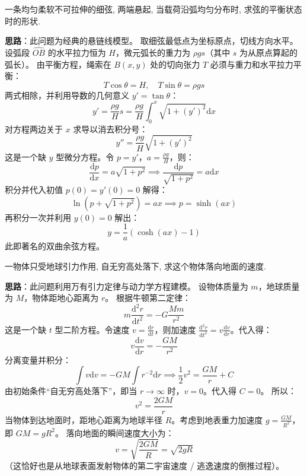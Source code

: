 \documentclass[lang=cn,11pt]{elegantbook}
\begin{document}
\begin{exercise}[物理建模与微分方程的推导]
一条均匀柔软不可拉伸的细弦, 两端悬起, 当载荷沿弧均匀分布时, 求弦的平衡状态时的形状.
\end{exercise}
\begin{solution}
\textbf{思路}：此问题为经典的悬链线模型。
取细弦最低点为坐标原点，切线方向水平。设弧段 $\widehat{OB}$ 的水平拉力恒为 $H$，微元弧长的重力为 $\rho g s$（其中 $s$ 为从原点算起的弧长）。
由平衡方程，绳索在 $B(x,y)$ 处的切向张力 $T$ 必须与重力和水平拉力平衡：
\[
T \cos\theta = H, \quad T \sin\theta = \rho g s
\]
两式相除，并利用导数的几何意义 $y' = \tan\theta$：
\[
y' = \frac{\rho g}{H} s = \frac{\rho g}{H} \int_0^x \sqrt{1+(y')^2}\mathrm{d}x
\]
对方程两边关于 $x$ 求导以消去积分号：
\[
y'' = \frac{\rho g}{H} \sqrt{1+(y')^2}
\]
这是一个缺 $y$ 型微分方程。令 $p=y'$，$a=\frac{\rho g}{H}$，则：
\[
\frac{\mathrm{d}p}{\mathrm{d}x} = a\sqrt{1+p^2} \implies \frac{\mathrm{d}p}{\sqrt{1+p^2}} = a\mathrm{d}x
\]
积分并代入初值 $p(0)=y'(0)=0$ 解得：
\[
\ln(p+\sqrt{1+p^2}) = ax \implies p = \sinh(ax)
\]
再积分一次并利用 $y(0)=0$ 解出：
\[
\boxed{y = \frac{1}{a}(\cosh(ax)-1)}
\]
此即著名的双曲余弦方程。
\end{solution}

\begin{exercise}[基于牛顿第二定律降阶求解]
一物体只受地球引力作用, 自无穷高处落下, 求这个物体落向地面的速度.
\end{exercise}
\begin{solution}
\textbf{思路}：此问题利用万有引力定律与动力学方程建模。
设物体质量为 $m$，地球质量为 $M$，物体距地心距离为 $r$。
根据牛顿第二定律：
\[
m\frac{\mathrm{d}^2r}{\mathrm{d}t^2} = -G\frac{Mm}{r^2}
\]
这是一个缺 $t$ 型二阶方程。令速度 $v = \frac{\mathrm{d}r}{\mathrm{d}t}$，则加速度 $\frac{\mathrm{d}^2r}{\mathrm{d}t^2} = v\frac{\mathrm{d}v}{\mathrm{d}r}$。代入得：
\[
v\frac{\mathrm{d}v}{\mathrm{d}r} = -\frac{GM}{r^2}
\]
分离变量并积分：
\[
\int v\mathrm{d}v = -GM \int r^{-2}\mathrm{d}r \implies \frac{1}{2}v^2 = \frac{GM}{r} + C
\]
由初始条件“自无穷高处落下”，即当 $r \to \infty$ 时，$v = 0$。代入得 $C=0$。
所以：
\[
v^2 = \frac{2GM}{r}
\]
当物体到达地面时，距地心距离为地球半径 $R$。考虑到地表重力加速度 $g = \frac{GM}{R^2}$，即 $GM = gR^2$。
落向地面的瞬间速度大小为：
\[
\boxed{v = \sqrt{\frac{2GM}{R}} = \sqrt{2gR}}
\]
（这恰好也是从地球表面发射物体的第二宇宙速度 / 逃逸速度的倒推过程）。
\end{solution}
\end{document}
